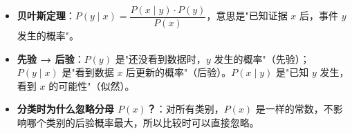\documentclass[a4paper,11pt]{ctexart}
\begin{document}
\begin{beginnerbox}
    \begin{itemize}
        \item \textbf{贝叶斯定理}：$P(y \mid x) = \dfrac{P(x \mid y) \cdot P(y)}{P(x)}$，意思是"已知证据 $x$ 后，事件 $y$ 发生的概率"。
        \item \textbf{先验 → 后验}：$P(y)$ 是"还没看到数据时，$y$ 发生的概率"（先验）；$P(y \mid x)$ 是"看到数据 $x$ 后更新的概率"（后验）。$P(x \mid y)$ 是"已知 $y$ 发生，看到 $x$ 的可能性"（似然）。
        \item \textbf{分类时为什么忽略分母 $P(x)$？}：对所有类别，$P(x)$ 是一样的常数，不影响哪个类别的后验概率最大，所以比较时可以直接忽略。
    \end{itemize}
\end{beginnerbox}
\end{document}
